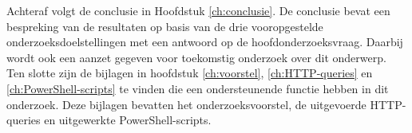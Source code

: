 Achteraf volgt de conclusie in Hoofdstuk \ref{ch:conclusie}. De conclusie bevat een bespreking van de resultaten op basis van de drie vooropgestelde onderzoeksdoelstellingen met een antwoord op de hoofdonderzoeksvraag. Daarbij wordt ook een aanzet gegeven voor toekomstig onderzoek over dit onderwerp. \\

Ten slotte zijn de bijlagen in hoofdstuk \ref{ch:voorstel}, \ref{ch:HTTP-queries} en \ref{ch:PowerShell-scripts} te vinden die een ondersteunende functie hebben in dit onderzoek. Deze bijlagen bevatten het onderzoeksvoorstel, de uitgevoerde \Ac{HTTP}-queries en uitgewerkte PowerShell-scripts.

\begin{comment}

De rest van deze bachelorproef is als volgt opgebouwd:

In Hoofdstuk~\ref{ch:stand-van-zaken} wordt een overzicht gegeven van de stand van zaken binnen het onderzoeksdomein, op basis van een literatuurstudie.

In Hoofdstuk~\ref{ch:methodologie} wordt de methodologie toegelicht en worden de gebruikte onderzoekstechnieken besproken om een antwoord te kunnen formuleren op de onderzoeksvragen.


In Hoofdstuk~\ref{ch:conclusie}, tenslotte, wordt de conclusie gegeven en een antwoord geformuleerd op de onderzoeksvragen. Daarbij wordt ook een aanzet gegeven voor toekomstig onderzoek binnen dit domein.
\end{comment}
